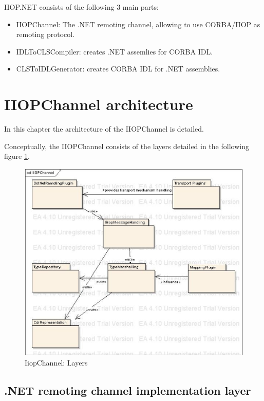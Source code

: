 \documentclass[a4paper]{report}
\begin{document}
IIOP.NET consists of the following 3 main parts:
\begin{itemize}
\item IIOPChannel: The .NET remoting channel, allowing to use CORBA/IIOP as remoting protocol.
\item IDLToCLSCompiler: creates .NET assemlies for CORBA IDL.
\item CLSToIDLGenerator: creates CORBA IDL for .NET assemblies.
\end{itemize}

\section{IIOPChannel architecture}
In this chapter the architecture of the IIOPChannel is detailed.

Conceptually, the IIOPChannel consists of the layers detailed in the following figure \ref{IiopChannelLayers}. 
\begin{figure}[h]
\begin{center}
\includegraphics[width=440pt]{IiopChannelLayers.eps}
\end{center}
\caption{\label{IiopChannelLayers} IiopChannel: Layers}
\end{figure}

\subsection{.NET remoting channel implementation layer}
\end{document}
